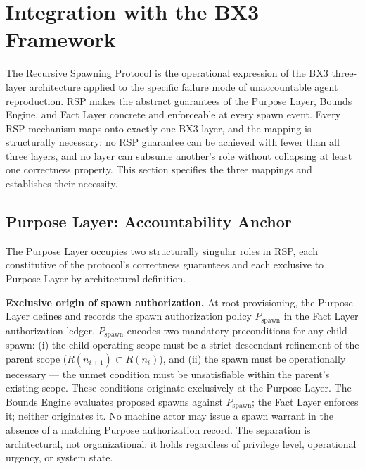 \section{Integration with the BX3 Framework}
\label{sec:rs-integration}

The Recursive Spawning Protocol is the operational expression of the BX3 three-layer architecture applied to the specific failure mode of unaccountable agent reproduction. RSP makes the abstract guarantees of the Purpose Layer, Bounds Engine, and Fact Layer concrete and enforceable at every spawn event. Every RSP mechanism maps onto exactly one BX3 layer, and the mapping is structurally necessary: no RSP guarantee can be achieved with fewer than all three layers, and no layer can subsume another's role without collapsing at least one correctness property. This section specifies the three mappings and establishes their necessity.

\subsection{Purpose Layer: Accountability Anchor}
\label{sec:rs-purpose-anchor}

The Purpose Layer occupies two structurally singular roles in RSP, each constitutive of the protocol's correctness guarantees and each exclusive to Purpose Layer by architectural definition.

\medskip
\noindent\textbf{Exclusive origin of spawn authorization.} At root provisioning, the Purpose Layer defines and records the spawn authorization policy $P_{\mathrm{spawn}}$ in the Fact Layer authorization ledger. $P_{\mathrm{spawn}}$ encodes two mandatory preconditions for any child spawn: (i) the child operating scope must be a strict descendant refinement of the parent scope ($R(n_{i+1}) \subset R(n_i)$), and (ii) the spawn must be operationally necessary — the unmet condition must be unsatisfiable within the parent's existing scope. These conditions originate exclusively at the Purpose Layer. The Bounds Engine evaluates proposed spawns against $P_{\mathrm{spawn}}$; the Fact Layer enforces it; neither originates it. No machine actor may issue a spawn warrant in the absence of a matching Purpose authorization record. The separation is architectural, not organizational: it holds regardless of privilege level, operational urgency, or system state.

